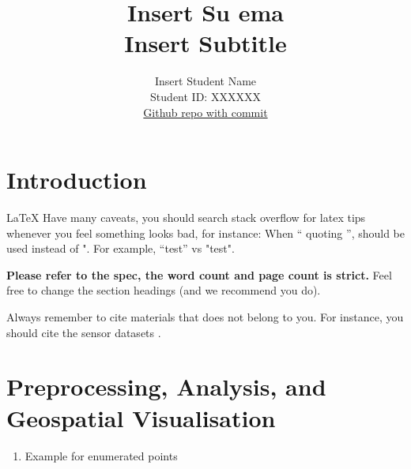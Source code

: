 \documentclass[11pt]{article}
\title{\textbf{Insert Su ema} \\ Insert Subtitle}
\author{
Insert Student Name \\
Student ID: XXXXXX \\
\href{https://github.com/MAST30034-Applied-Data-Science/mast30034\_p1\_template/tree/fd9f1dd17fdbcb5b119b70c93a22da8210d44fd7}{Github repo with commit}
}
\begin{document}
\maketitle

\section{Introduction}

\LaTeX{} Have many caveats, you should search stack overflow for latex tips whenever you feel something looks bad, for instance:
When `` quoting '', should be used instead of ". For example, ``test'' vs "test".

\textbf{Please refer to the spec, the word count and page count is strict.} Feel free to change the section headings (and we recommend you do).

Always remember to cite materials that does not belong to you. For instance, you should cite the sensor datasets \cite{2022sensorreading, 2022sensorlocation}.

\lipsum[7]

\section{Preprocessing, Analysis, and Geospatial Visualisation}
\begin{enumerate} 
    \item Example for enumerated points
\end{enumerate}
\end{document}
